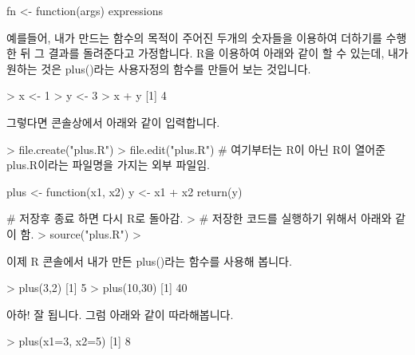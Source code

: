 \begin{Schunk}
\begin{Soutput}
fn <- function(args){
	expressions
}
\end{Soutput}
\end{Schunk}

예를들어, 내가 만드는 함수의 목적이 주어진 두개의 숫자들을 이용하여 더하기를 수행한 뒤 그 결과를 돌려준다고 가정합니다.
R을 이용하여 아래와 같이 할 수 있는데, 내가 원하는 것은 plus()라는 사용자정의 함수를 만들어 보는 것입니다. 

\begin{Schunk}
\begin{Soutput}
> x <- 1
> y <- 3
> x + y
[1] 4
\end{Soutput}
\end{Schunk}

그렇다면 콘솔상에서 아래와 같이 입력합니다. 

\begin{Schunk}
\begin{Soutput}
> file.create("plus.R")
> file.edit("plus.R")
# 여기부터는 R이 아닌 R이 열어준 plus.R이라는 파일명을 가지는 외부 파일임.

plus <- function(x1, x2){
	y <- x1 + x2
	return(y)
}

# 저장후 종료 하면 다시 R로 돌아감.
> # 저장한 코드를 실행하기 위해서 아래와 같이 함.
> source("plus.R")
>
\end{Soutput}
\end{Schunk}


%
%
%


이제 R 콘솔에서 내가 만든 plus()라는 함수를 사용해 봅니다. 

\begin{Schunk}
\begin{Soutput}
> plus(3,2)
[1] 5
> plus(10,30)
[1] 40
\end{Soutput}
\end{Schunk}

아하! 잘 됩니다. 
그럼 아래와 같이 따라해봅니다. 
\begin{Schunk}
\begin{Soutput}
> plus(x1=3, x2=5)
[1] 8
\end{Soutput}
\end{Schunk}


